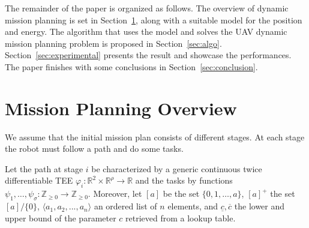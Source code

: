 \documentclass[letterpaper,10pt,conference]{ieeeconf}
\theoremstyle{definition}
\begin{document}
The remainder of the paper is organized as follows. The overview of dynamic mission planning is set in Section~\ref{sec:prob}, along with a suitable model for the position and energy. The algorithm that uses the model and solves the UAV dynamic mission planning problem is proposed in Section~\ref{sec:algo}. Section~\ref{sec:experimental} presents the result and showcase the performances. The paper finishes with some conclusions in Section~\ref{sec:conclusion}.


\section{Mission Planning Overview}
\label{sec:prob}

We assume that the initial mission plan consists of different stages. At each stage the robot must follow a path and do some tasks.

Let the path at stage $i$ be characterized by a generic continuous twice differentiable TEE $\varphi_i:\mathbb{R}^2\times\mathbb{R}^\rho\rightarrow\mathbb{R}$ and the tasks by functions $\psi_1,\dots,\psi_{\sigma}:\mathbb{Z}_{\geq 0}\rightarrow\mathbb{Z}_{\geq 0}$. Moreover, let $[a]$ be the set $\{0,1,\dots,a\}$, $[a]^+$ the set $[a]/\{0\}$, $\langle a_1,a_2,...,a_n\rangle$ an ordered list of $n$ elements, and $\underline{c},\overline{c}$ the lower and upper bound of the parameter $c$ retrieved from a lookup table.
\end{document}
